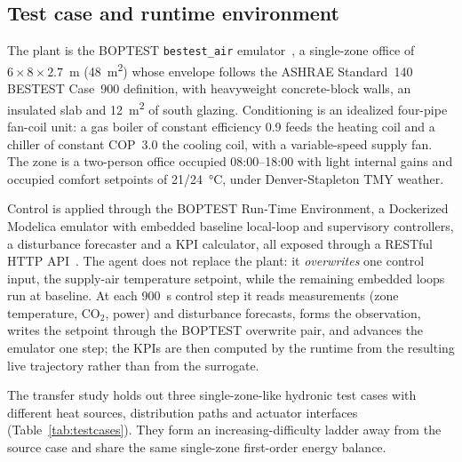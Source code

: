 \documentclass[energies,article,submit,moreauthors]{Definitions/mdpi}
\begin{document}
\subsection{Test case and runtime environment}\label{ssec:testcase}
The plant is the BOPTEST \texttt{bestest\_air} emulator~\cite{Blum2021BOPTEST,Wetter2014Modelica}, a
single-zone office of $6\times8\times2.7$~m (\SI{48}{\meter\squared}) whose envelope follows the
ASHRAE Standard~140 BESTEST Case~900 definition, with heavyweight concrete-block walls, an insulated
slab and \SI{12}{\meter\squared} of south glazing. Conditioning is an idealized four-pipe fan-coil
unit: a gas boiler of constant efficiency 0.9 feeds the heating coil and a chiller of constant
COP~3.0 the cooling coil, with a variable-speed supply fan. The zone is a two-person office occupied
08:00--18:00 with light internal gains and occupied comfort setpoints of 21/\SI{24}{\celsius}, under
Denver-Stapleton TMY weather.

Control is applied through the BOPTEST Run-Time Environment, a Dockerized Modelica emulator with
embedded baseline local-loop and supervisory controllers, a disturbance forecaster and a KPI
calculator, all exposed through a RESTful HTTP API~\cite{Arroyo2021GymBOPTEST}. The agent does not
replace the plant: it \emph{overwrites} one control input, the supply-air temperature setpoint,
while the remaining embedded loops run at baseline. At each \SI{900}{\second} control step it reads
measurements (zone temperature, CO$_2$, power) and disturbance forecasts, forms the observation,
writes the setpoint through the BOPTEST overwrite pair, and advances the emulator one step; the KPIs
are then computed by the runtime from the resulting live trajectory rather than from the surrogate.

The transfer study holds out three single-zone-like hydronic test cases with different heat sources,
distribution paths and actuator interfaces (Table~\ref{tab:testcases}). They form an
increasing-difficulty ladder away from the source case and share the same single-zone first-order
energy balance.
\end{document}
